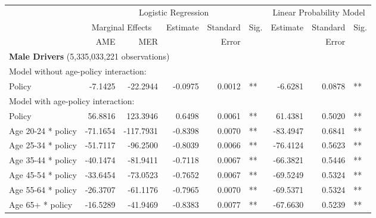 
\begin{table}%
\centering 
\begin{tabular}{l r r r r l r r l} 

\hline 
 
 & \multicolumn{5}{c}{Logistic Regression}  & \multicolumn{3}{c}{Linear Probability Model} \\ 

 \cmidrule(lr){2-6}\cmidrule(lr){7-9} 
 & \multicolumn{2}{c}{Marginal Effects} & Estimate & Standard & Sig. & Estimate & Standard & Sig. \\ 

 \cmidrule(lr){2-3} 
 &   AME &  MER  &          &  Error   &      &          &  Error   &     \\ 

\hline 
 
\multicolumn{8}{l}{\textbf{Male Drivers} (5,335,033,221 observations)} \\ 

\hline
\multicolumn{8}{l}{Model without age-policy interaction: } \\ 
Policy                   &  -7.1425        &  -22.2944       &  -0.0975        &  0.0012       &   **       &  -6.6281        &  0.0878       &   **       \\ 
\hline
\multicolumn{8}{l}{Model with age-policy interaction: } \\ 
Policy                   &  56.8816        &  123.3946       &  0.6498        &  0.0061       &   **       &  61.4381        &  0.5020       &   **       \\ 
Age 20-24 * policy   &  -71.1654        &  -117.7931       &  -0.8398        &  0.0070       &   **       &  -83.4947        &  0.6841       &   **       \\ 
Age 25-34 * policy   &  -51.7117        &  -96.2500       &  -0.8039        &  0.0066       &   **       &  -76.4124        &  0.5623       &   **       \\ 
Age 35-44 * policy   &  -40.1474        &  -81.9411       &  -0.7118        &  0.0067       &   **       &  -66.3821        &  0.5446       &   **       \\ 
Age 45-54 * policy   &  -33.6454        &  -73.0523       &  -0.7652        &  0.0067       &   **       &  -69.5249        &  0.5324       &   **       \\ 
Age 55-64 * policy   &  -26.3707        &  -61.1176       &  -0.7965        &  0.0070       &   **       &  -69.5371        &  0.5324       &   **       \\ 
Age 65+ * policy   &  -16.5289        &  -41.9469       &  -0.8383        &  0.0077       &   **       &  -67.6630        &  0.5239       &   **       \\ 


\end{tabular}
\end{table}
